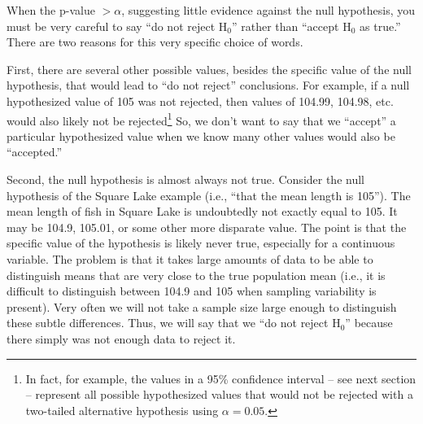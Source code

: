 \documentclass[10pt,openany]{book}\usepackage[]{graphicx}\usepackage[]{color}
\begin{document}
When the p-value $>\alpha$, suggesting little evidence against the null hypothesis, you must be very careful to say ``do not reject H$_{0}$'' rather than ``accept H$_{0}$ as true.'' There are two reasons for this very specific choice of words.

First, there are several other possible values, besides the specific value of the null hypothesis, that would lead to ``do not reject'' conclusions.  For example, if a null hypothesized value of 105 was not rejected, then values of 104.99, 104.98, etc. would also likely not be rejected\footnote{In fact, for example, the values in a 95\% confidence interval -- see next section -- represent all possible hypothesized values that would not be rejected with a two-tailed alternative hypothesis using $\alpha=0.05$.}  So, we don't want to say that we ``accept'' a particular hypothesized value when we know many other values would also be ``accepted.''

Second, the null hypothesis is almost always not true.  Consider the null hypothesis of the Square Lake example (i.e., ``that the mean length is 105'').  The mean length of fish in Square Lake is undoubtedly not exactly equal to 105.  It may be 104.9, 105.01, or some other more disparate value.  The point is that the specific value of the hypothesis is likely never true, especially for a continuous variable.  The problem is that it takes large amounts of data to be able to distinguish means that are very close to the true population mean (i.e., it is difficult to distinguish between 104.9 and 105 when sampling variability is present).  Very often we will not take a sample size large enough to distinguish these subtle differences.  Thus, we will say that we ``do not reject H$_{0}$'' because there simply was not enough data to reject it.
\end{document}
